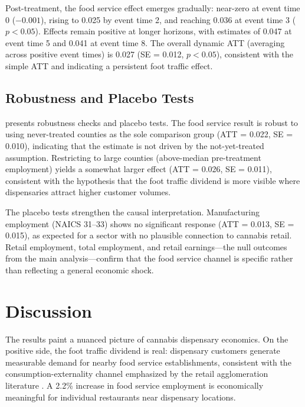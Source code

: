 \documentclass[12pt]{article}
\begin{document}
Post-treatment, the food service effect emerges gradually: near-zero at event time 0 ($-0.001$), rising to 0.025 by event time 2, and reaching 0.036 at event time 3 ($p < 0.05$). Effects remain positive at longer horizons, with estimates of 0.047 at event time 5 and 0.041 at event time 8. The overall dynamic ATT (averaging across positive event times) is 0.027 (SE = 0.012, $p < 0.05$), consistent with the simple ATT and indicating a persistent foot traffic effect.



\subsection{Robustness and Placebo Tests}

 presents robustness checks and placebo tests. The food service result is robust to using never-treated counties as the sole comparison group (ATT = 0.022, SE = 0.010), indicating that the estimate is not driven by the not-yet-treated assumption. Restricting to large counties (above-median pre-treatment employment) yields a somewhat larger effect (ATT = 0.026, SE = 0.011), consistent with the hypothesis that the foot traffic dividend is more visible where dispensaries attract higher customer volumes.

The placebo tests strengthen the causal interpretation. Manufacturing employment (NAICS 31--33) shows no significant response (ATT = 0.013, SE = 0.015), as expected for a sector with no plausible connection to cannabis retail. Retail employment, total employment, and retail earnings---the null outcomes from the main analysis---confirm that the food service channel is specific rather than reflecting a general economic shock.




\section{Discussion}
\label{sec:discussion}

The results paint a nuanced picture of cannabis dispensary economics. On the positive side, the foot traffic dividend is real: dispensary customers generate measurable demand for nearby food service establishments, consistent with the consumption-externality channel emphasized by the retail agglomeration literature \citep{Basker2007, Neumark2011}. A 2.2\% increase in food service employment is economically meaningful for individual restaurants near dispensary locations.
\end{document}
